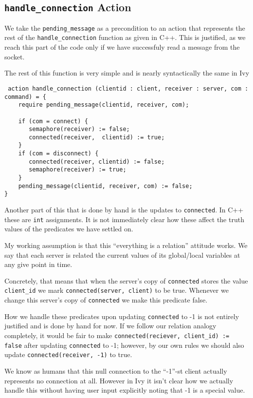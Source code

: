 \documentclass[11pt]{article}
\begin{document}
\subsection{\texttt{handle\_connection} Action}
\label{sec:orgbea3796}
We take the \texttt{pending\_message} as a precondition to an action that represents the rest of the \texttt{handle\_connection} function as given in C++. This is justified, as we reach this part of the code only if we have successfuly read a message from the socket.

The rest of this function is very simple and is nearly syntactically the same in Ivy
\begin{verbatim}
 action handle_connection (clientid : client, receiver : server, com : command) = {
    require pending_message(clientid, receiver, com);

    if (com = connect) {
       semaphore(receiver) := false;
       connected(receiver,  clientid) := true;
    }
    if (com = disconnect) {
       connected(receiver, clientid) := false;
       semaphore(receiver) := true;
    }
    pending_message(clientid, receiver, com) := false;
}
\end{verbatim}

Another part of this that is done by hand is the updates to \texttt{connected}. In C++ these are \texttt{int} assignments. It is not immediately clear how these affect the truth values of the predicates we have settled on.

My working assumption is that this ``everything is a relation'' attitude works. We say that each server is related the current values of its global/local variables at any give point in time.

Concretely, that means that when the server's copy of \texttt{connected} stores the value \texttt{client\_id} we mark \texttt{connected(server, client)} to be true. Whenever we change this server's copy of \texttt{connected} we make this predicate false.

How we handle these predicates upon updating \texttt{connected} to -1 is not entirely justified and is done by hand for now. If we follow our relation analogy completely, it would be fair to make \texttt{connected(reciever, client\_id) := false} after updating \texttt{connected} to -1; however, by our own rules we should also update \texttt{connected(receiver, -1)} to true.

We know as humans that this null connection to the ``-1''-st client actually represents no connection at all. However in Ivy it isn't clear how we actually handle this without having user input explicitly noting that -1 is a special value.
\end{document}
